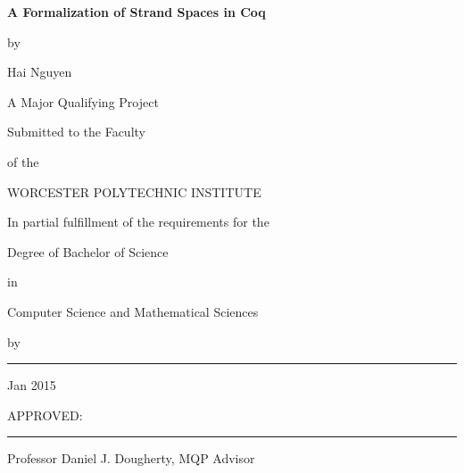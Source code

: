 \documentclass[12pt]{report}
\begin{document}
\newcommand{\brk}{\vspace*{0.18in}}

\thispagestyle{empty}

\begin{center}

\brk
   {\large 
	\textbf{
	 	A Formalization of Strand Spaces in Coq
	}
   }


\brk
by

\brk
Hai Nguyen


\brk\brk
A Major Qualifying Project

\brk
Submitted to the Faculty

\brk
of the 

\brk
WORCESTER POLYTECHNIC INSTITUTE
	
\brk
In partial fulfillment of the requirements for the

\brk
Degree of Bachelor of Science

\brk
in

\brk
Computer Science and Mathematical Sciences

\brk
by

\brk\brk
\rule{3in}{1.2pt}

\brk
Jan 2015

\end{center}

	
\vfill
APPROVED:

\vspace{0.5in}
\rule{3in}{0.8pt}

Professor Daniel J. Dougherty, MQP Advisor

\newpage

\doublespacing
\end{document}
